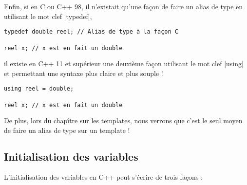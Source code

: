 Enfin, si en C ou C++ 98, il n'existait qu'une façon de faire un alias de type en utilisant le mot clef |typedef|,

\begin{lstlisting}
typedef double reel; // Alias de type à la façon C

reel x; // x est en fait un double
\end{lstlisting}

il existe en C++ 11 et supérieur une deuxième façon utilisant le mot clef |using| et permettant une syntaxe plus claire
et plus souple !

\begin{lstlisting}
using reel = double;

reel x; // x est en fait un double
\end{lstlisting}

De plus, lors du chapître sur les templates, nous verrons que c'est le seul moyen de faire un alias de type sur un template !

\subsection{Initialisation des variables}

L'initialisation des variables en C++ peut s'écrire de trois façons :

